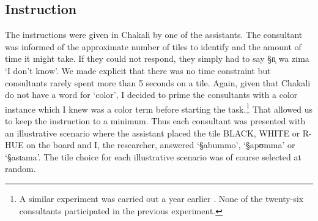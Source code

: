 \subsection{Instruction}
\label{sec:instruction}

The instructions were given in Chakali by  one of the assistants. The
consultant was informed of the approximate number of tiles to identify and the
amount of time it might take. If they could not respond, they  simply had to
say {\S n̩ wa zɪma} `I don't know'. We made explicit that there was no time
constraint but  consultants rarely spent more than 5 seconds on a tile.
Again, given that Chakali do not have a word for `color', I decided to prime
the consultants with a color instance which I knew was a color term
before starting the task.\footnote{A similar experiment was carried out a year
earlier \citep{Brin08a}. None of the twenty-six consultants participated in the
previous experiment.} That allowed us to keep the instruction to a minimum. 
Thus each consultant was presented with an illustrative scenario where the
assistant placed the tile  BLACK, WHITE or R-HUE on the board and I, the researcher, 
answered `{\S abummo}',  `{\S apʊmma}' or   `{\S asɪama}'. The tile choice for
each illustrative scenario  was of course selected at random.

